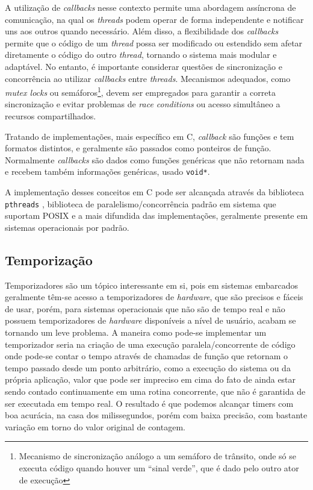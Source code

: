 A utilização de \textit{callbacks} nesse contexto permite uma abordagem assíncrona de comunicação, na qual os \textit{threads} podem operar de forma independente e notificar uns aos outros quando necessário. Além disso, a flexibilidade dos \textit{callbacks} permite que o código de um \textit{thread} possa ser modificado ou estendido sem afetar diretamente o código do outro \textit{thread}, tornando o sistema mais modular e adaptável. No entanto, é importante considerar questões de sincronização e concorrência ao utilizar \textit{callbacks} entre \textit{threads}. Mecanismos adequados, como \textit{mutex locks} ou semáforos\footnote{Mecanismo de sincronização análogo a um semáforo de trânsito, onde só se executa código quando houver um ``sinal verde'', que é dado pelo outro ator de execução}, devem ser empregados para garantir a correta sincronização e evitar problemas de \textit{race conditions} ou acesso simultâneo a recursos compartilhados.

Tratando de implementações, mais específico em C, \textit{callback} são funções e tem formatos distintos, e geralmente são passados como ponteiros de função. Normalmente \textit{callbacks} são dados como funções genéricas que não retornam nada e recebem também informações genéricas, usado \lstinline{void*}.



A implementação desses conceitos em C pode ser alcançada através da biblioteca \lstinline{pthreads} \cite{pthreads}, biblioteca de paralelismo/concorrência padrão em sistema que suportam POSIX e a mais difundida das implementações, geralmente presente em sistemas operacionais por padrão.    

\subsection{Temporização}

Temporizadores são um tópico interessante em si, pois em sistemas embarcados geralmente têm-se acesso a temporizadores de \textit{hardware}, que são precisos e fáceis de usar, porém, para sistemas operacionais que não são de tempo real e não possuem temporizadores de \textit{hardware} disponíveis a nível de usuário, acabam se tornando um leve problema. A maneira como pode-se implementar um temporizador seria na criação de uma execução paralela/concorrente de código onde pode-se contar o tempo através de chamadas de função que retornam o tempo passado desde um ponto arbitrário, como a execução do sistema ou da própria aplicação, valor que pode ser impreciso em cima do fato de ainda estar sendo contado continuamente em uma rotina concorrente, que não é garantida de ser executada em tempo real. O resultado é que podemos alcançar timers com boa acurácia, na casa dos milissegundos, porém com baixa precisão, com bastante variação em torno do valor original de contagem.

